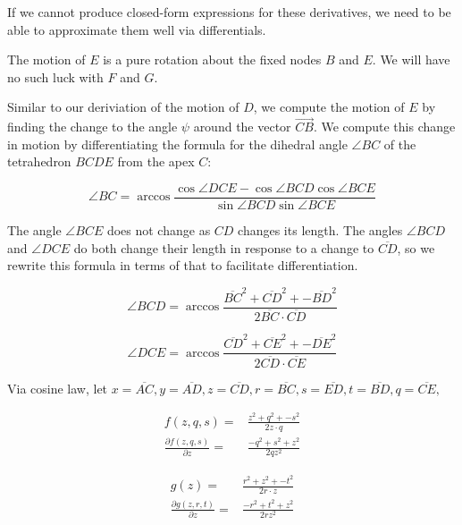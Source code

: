 \documentclass[11pt]{article}
\begin{document}
If we cannot produce closed-form expressions for these derivatives, we need to be able to approximate them well via differentials.

The motion of $E$ is a pure rotation about the fixed nodes $B$ and $E$. We will have no such luck with $F$ and $G$.

Similar to our deriviation of the motion of $D$, we compute the motion of $E$ by finding the change to the angle $\psi$ around the
vector $\overrightarrow{CB}$. We compute this change in motion by differentiating the formula for the dihedral angle $\angle BC$ of
the tetrahedron $BCDE$ from the apex $C$:

\begin{equation}
 \angle BC  =\arccos{\frac{\cos{\angle DCE} - \cos{\angle BCD}\cos{\angle BCE}}{\sin{\angle BCD}\sin{\angle BCE}}}
\end{equation}

The angle $\angle BCE$ does not change as $CD$ changes its length. The angles $\angle BCD$ and $\angle DCE$ do both
change their length in response to a change to $\overline{CD}$, so we rewrite this formula in terms of that to facilitate differentiation.

\begin{equation}
\angle BCD  = \arccos{\frac{\overline{BC}^2 + \overline{CD}^2 + -\overline{BD}^2}{2\overline{BC}\cdot\overline{CD}}}
\end{equation}


\begin{equation}
\angle DCE  = \arccos{\frac{\overline{CD}^2 + \overline{CE}^2 + -\overline{DE}^2}{2\overline{CD}\cdot \overline{CE}}}
\end{equation}


Via cosine law, let $x = \overline{AC}, y = \overline{AD}, z = \overline{CD}, r = \overline{BC}, s = \overline{ED},
t = \overline{BD}, q = \overline{CE},$

\begin{align*}
  f(z,q,s) =  & \frac{z^2 + q^2 + -s^2}{2z\cdot q} \\
  \frac{\partial f(z,q,s)}{\partial z} = & \frac{-q^2 + s^2 + z^2}{2 q z^2}
\end{align*}

\begin{align*}
  g(z) = &  \frac{r^2 + z^2 + -t^2}{2r\cdot z} \\
  \frac{\partial g(z,r,t)}{\partial z} = & \frac{-r^2 + t^2 + z^2}{2 r z^2}
\end{align*}
\end{document}
